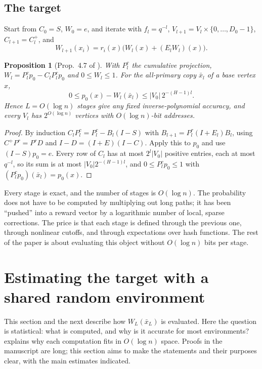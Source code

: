 \documentclass[11pt]{article}
\newtheorem{proposition}[theorem]{Proposition}
\theoremstyle{definition}
\theoremstyle{remark}
\newcommand{\abs}[1]{\lvert #1\rvert}
\begin{document}
\subsection{The target}\label{sec:target}

Start from $C_0=S$, $W_0=e$, and iterate with $f_l=q^{-l}$,
$V_{l+1}=V_l\times\{0,\dots,D_0-1\}$, $C_{l+1}=C_l^+$, and
\[
W_{l+1}(x_i)=r_i(x)\bigl(W_l(x)+(E_lW_l)(x)\bigr).
\]

\begin{proposition}[Prop.~4.7 of \cite{OpenAI-BPL}]\label{prop:target}
With $P_l^c$ the cumulative projection, $W_l=P_l^cp_0-C_lP_l^cp_0$ and $0\le W_l\le1$.
For the all-primary copy $\bar x_l$ of a base vertex $x$,
\[
0\le p_0(x)-W_l(\bar x_l)\le\abs{V_0}\,2^{-(H-1)l}.
\]
Hence $L=O(\log n)$ stages give any fixed inverse-polynomial accuracy, and every
$V_l$ has $2^{O(\log n)}$ vertices with $O(\log n)$-bit addresses.
\end{proposition}

\begin{proof}
By induction $C_lP_l^c=P_l^c-B_l(I-S)$ with $B_{l+1}=P^r_l(I+E_l)B_l$, using
$C^+P^r=P^rD$ and $I-D=(I+E)(I-C)$. Apply this to $p_0$ and use $(I-S)p_0=e$. Every
row of $C_l$ has at most $2^l\abs{V_0}$ positive entries, each at most $q^{-l}$, so
its sum is at most $\abs{V_0}2^{-(H-1)l}$, and $0\le P_l^cp_0\le1$ with
$(P_l^cp_0)(\bar x_l)=p_0(x)$.
\end{proof}

\begin{idea}
Every stage is exact, and the number of stages is $O(\log n)$. The probability
does not have to be computed by multiplying out long paths; it has been
``pushed'' into a reward vector by a logarithmic number of local, sparse
corrections. The price is that each stage is defined through the previous one,
through nonlinear cutoffs, and through expectations over hash functions. The
rest of the paper is about evaluating this object without $O(\log n)$ bits per
stage.
\end{idea}

\section{Estimating the target with a shared random environment}\label{sec:estimator}

This section and the next describe how $W_L(\bar x_L)$ is evaluated. Here the
question is statistical: what is computed, and why is it accurate for most
environments?  explains why each computation fits in $O(\log n)$
space. Proofs in the manuscript are long; this section aims to make the
statements and their purposes clear, with the main estimates indicated.
\end{document}
